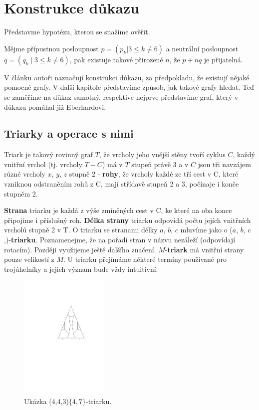 
\chapter{Konstrukce důkazu}

Představme hypotézu, kterou se snažíme ověřit.
\begin{hypot}\label{veta02:hypoteza}
Mějme přípustnou posloupnost $p=(p_k | 3 \leq k \neq 6)$ a neutrální posloupnost $q=(q_k \mid 3 \leq k \neq 6)$, pak existuje takové přirozené $n$, že $p+nq$ je přijatelná.
\end{hypot}


V článku \citep{Samal09} autoři naznačují konstrukci důkazu, za předpokladu, že existují nějaké pomocné grafy. V další kapitole představíme způsob, jak takové grafy hledat. Teď se zaměříme na důkaz samotný, respektive nejprve představíme graf, který v důkazu pomáhal již Eberhardovi.

\section{Triarky a operace s nimi}

\begin{definice}[Triark]\label{def02:1}
Triark je takový rovinný graf $T$, že vrcholy jeho vnější stěny tvoří cyklus $C$, každý vnitřní vrchol (tj. vrcholy $T-C$) má v $T$ stupeň právě 3 a v $C$ jsou tři navzájem různé vrcholy $x$, $y$, $z$ stupně 2 - \textbf{rohy}, že vrcholy každé ze tří cest v C, které vzniknou odstraněním rohů z C, mají střídavě stupeň 2 a 3, počínaje i konče stupněm 2.
\end{definice}

\textbf{Strana} triarku je každá z výše zmíněných cest v C, ke které na oba konce připojíme i příslušný roh. \textbf{Délka strany} triarku odpovídá počtu jejích vnitřních vrcholů stupně 2 v T. O triarku se stranami délky $a$, $b$, $c$ mluvíme jako o ($a$, $b$, $c$,)-\textbf{triarku}. Poznamenejme, že na pořadí stran v názvu nezáleží (odpovídají rotacím). Později využijeme ještě dalšího značení. $M$-\textbf{triark} má vnitřní strany pouze velikostí z $M$. U triarku přejímáme některé termíny používané pro trojúhelníky a jejich význam bude vždy intuitivní.

\begin{figure}[h!]\centering
\includegraphics[height=60mm]{../img/triarc}
\caption{Ukázka (4,4,3)$ \lbrace 4,7\rbrace $-triarku.}
\label{obr03:triark}
\end{figure}

